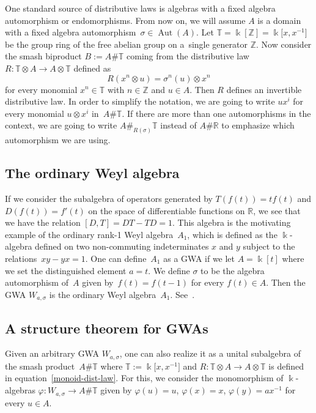 \documentclass[pdftex]{sigma}
\newcommand{\B}[1]{\mathbb{#1}}
\numberwithin{equation}{section}
\begin{document}
One standard source of distributive laws is algebras with a fixed algebra automorphism or
endomorphisms. From now on, we will assume $A$ is a domain with a fixed algebra automorphism~${\sigma\in \operatorname{Aut}(A)}$. Let $\B{T}=\Bbbk[\B{Z}] = \Bbbk\big[x,x^{-1}\big]$ be the group ring of the
free abelian group on a~single generator $\B{Z}$. Now consider the smash biproduct
$B := A\# \B{T}$ coming from the distributive law $R\colon \B{T}\otimes A\to A\otimes \B{T}$
defined as
\begin{equation}\label{monoid-dist-law} R(x^n\otimes u) = \sigma^n(u)\otimes x^n
\end{equation} for every monomial $x^n\in \B{T}$ with $n\in\B{Z}$ and $u\in A$. Then $R$
defines an invertible distributive law. In order to simplify the notation, we are going
to write $ux^i$ for every monomial $u\otimes x^i$ in~$A\# \B{T}$. If there are more
than one automorphisms in the context, we are going to write $A\#_{R(\sigma)} \B{T}$
instead of $A\# \B{R}$ to emphasize which automorphism we are using.

\subsection{The ordinary Weyl algebra}\label{sect:OrdinaryWeyl}

If we consider the subalgebra of operators generated by $T(f(t)) = t f(t)$ and
$D(f(t))= f'(t)$ on the space of differentiable functions on $\B{R}$, we see that we have
the relation $[D,T] = {DT - TD = 1}$. This algebra is the motivating example of the ordinary rank-1 Weyl
algebra~$A_1$, which is defined as the $\Bbbk$-algebra defined on two non-commuting
indeterminates $x$ and $y$ subject to the relations~${xy - yx = 1}$. One can define~$A_1$ as a GWA if we let $A=\Bbbk[t]$ where we set the
distinguished element $a=t$. We define $\sigma$ to be the algebra automorphism of~$A$ given
by~${f(t) = f(t-1)}$ for every $f(t)\in A$. Then the GWA $W_{a,\sigma}$ is the ordinary Weyl
algebra~$A_1$. See~\cite[Example~2.3]{BavulaJordan:IsoProblem}.

\subsection{A structure theorem for GWAs}\label{sect:structureTheorem}

Given an arbitrary GWA $W_{a,\sigma}$, one can also realize it as a unital subalgebra of the smash
product~$A\# \B{T}$ where $\B{T}:= \Bbbk\big[x,x^{-1}\big]$ and $R\colon \B{T}\otimes A\to A\otimes \B{T}$
is defined in equation~\eqref{monoid-dist-law}. For this, we consider the monomorphism of
$\Bbbk$-algebras $\varphi\colon W_{a,\sigma}\to A\# \B{T}$ given by
$
\varphi(u) = u$, $ \varphi(x) = x$, $ \varphi(y) = ax^{-1}
$ for every $u\in A$.
\end{document}
